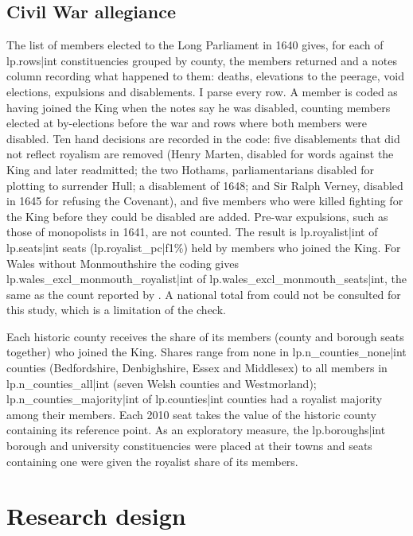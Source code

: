 \documentclass[11pt,a4paper]{article}
\begin{document}
\subsection{Civil War allegiance}
The list of members elected to the Long Parliament in 1640 \citep{wiki1640} gives, for each of {{lp.rows|int}} constituencies grouped by county, the members returned and a notes column recording what happened to them: deaths, elevations to the peerage, void elections, expulsions and disablements. I parse every row. A member is coded as having joined the King when the notes say he was disabled, counting members elected at by-elections before the war and rows where both members were disabled. Ten hand decisions are recorded in the code: five disablements that did not reflect royalism are removed (Henry Marten, disabled for words against the King and later readmitted; the two Hothams, parliamentarians disabled for plotting to surrender Hull; a disablement of 1648; and Sir Ralph Verney, disabled in 1645 for refusing the Covenant), and five members who were killed fighting for the King before they could be disabled are added. Pre-war expulsions, such as those of monopolists in 1641, are not counted. The result is {{lp.royalist|int}} of {{lp.seats|int}} seats ({{lp.royalist_pc|f1}}\%) held by members who joined the King. For Wales without Monmouthshire the coding gives {{lp.wales_excl_monmouth_royalist|int}} of {{lp.wales_excl_monmouth_seats|int}}, the same as the count reported by \citet{dodd1952}. A national total from \citet{brunton1954} could not be consulted for this study, which is a limitation of the check.

Each historic county receives the share of its members (county and borough seats together) who joined the King. Shares range from none in {{lp.n_counties_none|int}} counties (Bedfordshire, Denbighshire, Essex and Middlesex) to all members in {{lp.n_counties_all|int}} (seven Welsh counties and Westmorland); {{lp.n_counties_majority|int}} of {{lp.counties|int}} counties had a royalist majority among their members. Each 2010 seat takes the value of the historic county containing its reference point. As an exploratory measure, the {{lp.boroughs|int}} borough and university constituencies were placed at their towns and seats containing one were given the royalist share of its members.

\section{Research design}\label{sec:design}
\end{document}
